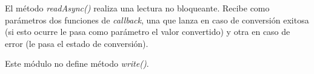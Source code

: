 El método \emph{readAsync()} realiza una lectura no bloqueante. Recibe como parámetros dos funciones de \emph{callback}, una que lanza en caso de conversión exitosa (si esto ocurre le pasa como parámetro el valor convertido) y otra en caso de error (le pasa el estado de conversión).

Este módulo no define método \emph{write()}.

